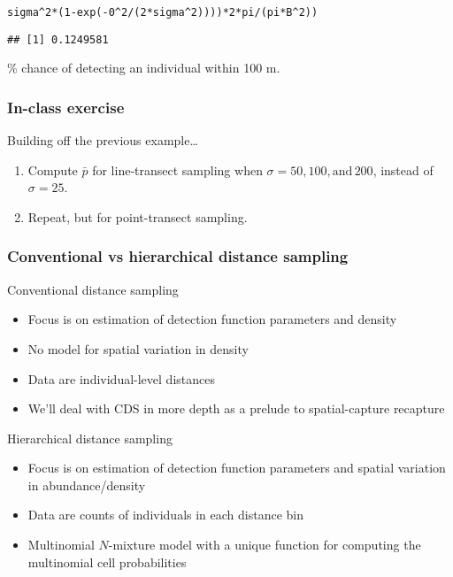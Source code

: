 \documentclass[color=usenames,dvipsnames]{beamer}\usepackage[]{graphicx}\usepackage[]{color}
\makeatletter
\newcommand{\hlnum}[1]{\textcolor[rgb]{0.69,0.494,0}{#1}}%
\newcommand{\hlopt}[1]{\textcolor[rgb]{0,0,0}{#1}}%
\newcommand{\hlstd}[1]{\textcolor[rgb]{0,0,0}{#1}}%
\newcommand{\hlkwd}[1]{\textcolor[rgb]{0.004,0.004,0.506}{#1}}%
\newenvironment{kframe}{%
 \def\at@end@of@kframe{}%
 \ifinner\ifhmode%
  \def\at@end@of@kframe{\end{minipage}}%
  \begin{minipage}{\columnwidth}%
 \fi\fi%
 \def\FrameCommand##1{\hskip\@totalleftmargin \hskip-\fboxsep
 \colorbox{shadecolor}{##1}\hskip-\fboxsep
     \hskip-\linewidth \hskip-\@totalleftmargin \hskip\columnwidth}%
 \MakeFramed {\advance\hsize-\width
   \@totalleftmargin\z@ \linewidth\hsize
   \@setminipage}}%
 {\par\unskip\endMakeFramed%
 \at@end@of@kframe}
\newenvironment{knitrout}{}{} %
\makeatother
\begin{document}
\begin{frame}[fragile]
\begin{knitrout}
\begin{kframe}
\begin{alltt}
          \hlstd{sigma}\hlopt{^}\hlnum{2}\hlopt{*}\hlstd{(}\hlnum{1}\hlopt{-}\hlkwd{exp}\hlstd{(}\hlopt{-}\hlnum{0}\hlopt{^}\hlnum{2}\hlopt{/}\hlstd{(}\hlnum{2}\hlopt{*}\hlstd{sigma}\hlopt{^}\hlnum{2}\hlstd{))))} \hlopt{*} \hlnum{2}\hlopt{*}\hlstd{pi}\hlopt{/}\hlstd{(pi}\hlopt{*}\hlstd{B}\hlopt{^}\hlnum{2}\hlstd{))}
\end{alltt}
\begin{verbatim}
## [1] 0.1249581
\end{verbatim}
\end{kframe}
\end{knitrout}
\pause
\vfill
{}\% chance of detecting an individual within 100 m. \\
\end{frame}





\begin{frame}
  \frametitle{In-class exercise}
  Building off the previous example\dots
  \begin{enumerate}
    \item Compute $\bar{p}$ for line-transect sampling when
      $\sigma=50, 100, \mathrm{and}\, 200$, instead of $\sigma=25$.  
    \item Repeat, but for point-transect sampling. 
  \end{enumerate}
\end{frame}




\begin{frame}
  \frametitle{\large Conventional vs hierarchical distance sampling}
  \alert{Conventional} distance sampling
  \begin{itemize}
    \item Focus is on estimation of detection function parameters and density
    \item No model for spatial variation in density
    \item Data are individual-level distances
    \item We'll deal with CDS in more depth as a prelude to
      spatial-capture recapture
  \end{itemize}
  \pause
  \vfill
  \alert{Hierarchical} distance sampling
  \begin{itemize}
    \item Focus is on estimation of detection function parameters and
      spatial variation in abundance/density
    \item Data are counts of individuals in each distance bin
    \item Multinomial $N$-mixture model with a unique function for
      computing the multinomial cell probabilities 
  \end{itemize}
\end{frame}
\end{document}
